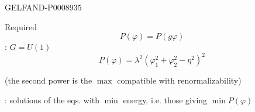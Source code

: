 \begin{GelfandAdjacentEvidence}{GELFAND-P000893}{5}


Required
\begin{equation*}
P(\varphi)=P(g\varphi) \tag{14}
\end{equation*}
: $G=U(1)$
\begin{equation*}
P(\varphi)=\lambda^2(\varphi_1^2+\varphi_2^2-\eta^2)^2 \tag{15}
\end{equation*}
\end{GelfandAdjacentEvidence}


(the second power is the $\max$ compatible with renormalizability)

: solutions of the eqs. with $\min$ energy, i.e. those giving $\underline{\min P(\varphi)}$


